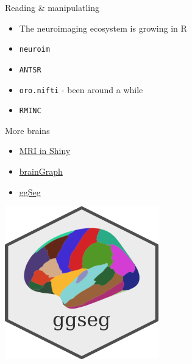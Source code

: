 \documentclass[
  ignorenonframetext,
]{beamer}
\providecommand{\tightlist}{%
  \setlength{\itemsep}{0pt}\setlength{\parskip}{0pt}}
\begin{document}
\begin{frame}[fragile]{Reading \& manipulatling}
\protect\hypertarget{reading-manipulatling}{}

\begin{itemize}
\tightlist
\item
  The neuroimaging ecosystem is growing in R
\item
  \texttt{neuroim}
\item
  \texttt{ANTSR}
\item
  \texttt{oro.nifti} - been around a while
\item
  \texttt{RMINC}
\end{itemize}

\end{frame}

\begin{frame}{More brains}
\protect\hypertarget{more-brains}{}

\begin{itemize}
\tightlist
\item
  \href{https://community.rstudio.com/t/shiny-contest-submission-shinymri-view-mri-images-in-shiny/23995}{MRI
  in Shiny}
\item
  \href{https://github.com/cwatson/brainGraph}{brainGraph}
\item
  \href{https://github.com/LCBC-UiO/ggseg}{ggSeg}
\end{itemize}

\includegraphics[width=0.5\textwidth,height=\textheight]{../external/images/ggseglogo.png}

\end{frame}
\end{document}
